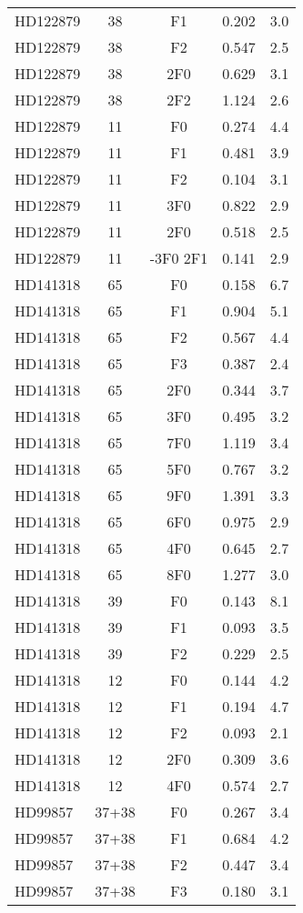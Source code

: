 \begin{table*}
\begin{tabular}{l c c c c}
HD122879 & 38 & F1 & 0.202 & 3.0\\ 
HD122879 & 38 & F2 & 0.547 & 2.5\\ 
HD122879 & 38 & 2F0 & 0.629 & 3.1\\ 
HD122879 & 38 & 2F2 & 1.124 & 2.6\\ 
\hline
HD122879 & 11 & F0 & 0.274 & 4.4\\ 
HD122879 & 11 & F1 & 0.481 & 3.9\\ 
HD122879 & 11 & F2 & 0.104 & 3.1\\ 
HD122879 & 11 & 3F0 & 0.822 & 2.9\\ 
HD122879 & 11 & 2F0 & 0.518 & 2.5\\ 
HD122879 & 11 & -3F0 2F1 & 0.141 & 2.9\\ 
\hline
HD141318 & 65 & F0 & 0.158 & 6.7\\ 
HD141318 & 65 & F1 & 0.904 & 5.1\\ 
HD141318 & 65 & F2 & 0.567 & 4.4\\ 
HD141318 & 65 & F3 & 0.387 & 2.4\\ 
HD141318 & 65 & 2F0 & 0.344 & 3.7\\ 
HD141318 & 65 & 3F0 & 0.495 & 3.2\\ 
HD141318 & 65 & 7F0 & 1.119 & 3.4\\ 
HD141318 & 65 & 5F0 & 0.767 & 3.2\\ 
HD141318 & 65 & 9F0 & 1.391 & 3.3\\ 
HD141318 & 65 & 6F0 & 0.975 & 2.9\\ 
HD141318 & 65 & 4F0 & 0.645 & 2.7\\ 
HD141318 & 65 & 8F0 & 1.277 & 3.0\\ 
\hline
HD141318 & 39 & F0 & 0.143 & 8.1\\ 
HD141318 & 39 & F1 & 0.093 & 3.5\\ 
HD141318 & 39 & F2 & 0.229 & 2.5\\ 
\hline
HD141318 & 12 & F0 & 0.144 & 4.2\\ 
HD141318 & 12 & F1 & 0.194 & 4.7\\ 
HD141318 & 12 & F2 & 0.093 & 2.1\\ 
HD141318 & 12 & 2F0 & 0.309 & 3.6\\ 
HD141318 & 12 & 4F0 & 0.574 & 2.7\\ 
\hline
HD99857 & 37+38 & F0 & 0.267 & 3.4\\ 
HD99857 & 37+38 & F1 & 0.684 & 4.2\\ 
HD99857 & 37+38 & F2 & 0.447 & 3.4\\ 
HD99857 & 37+38 & F3 & 0.180 & 3.1\\ 

\end{tabular}
\end{table*}
